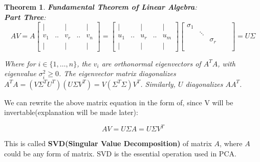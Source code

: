 \documentclass[a4paper]{book}
\newtheorem{theorem}{Theorem}[section]
\begin{document}
    \begin{theorem}
      \textbf{Fundamental Theorem of Linear Algebra}:\\
      \textbf{Part Three}:
      \begin{displaymath}
        AV = A
        \begin{bmatrix}
            |   &    &   |   &    &   |  \\
          v_{1} & .. & v_{r} & .. & v_{n}\\
            |   &    &   |   &    &   |
        \end{bmatrix}
        =
        \begin{bmatrix}
            |   &    &   |   &    &   |  \\
          u_{1} & .. & u_{r} & .. & u_{m}\\
            |   &    &   |   &    &   |  
        \end{bmatrix}
        \begin{bmatrix}
          \sigma_{1}  &         &       &    &      \\
                      & \ddots  &       &    &      \\
                      &         & \sigma_{r} &    & \\
                      &         &            &    & \\
        \end{bmatrix}
        = U\Sigma
      \end{displaymath}

      Where for $i \in \{1, \ldots , n\}$, the $v_i$ are orthonormal eigenvectors
      of $A^{T}A$, with eigenvalue $\sigma_{i}^{2} \geq 0$. The
      eigenvector matrix diagonalizes $A^{T}A =
      (V\Sigma^{T}U^{T})(U\Sigma V^{T}) = V(\Sigma^{T}\Sigma)V^{T}$.
      Similarly, $U$ diagonalizes $AA^{T}$.
    \end{theorem}

    We can rewrite the above matrix equation in the form of, since V
    will be invertable(explanation will be made later):

    \begin{equation}
      AV = U\Sigma
      A = U\Sigma V^{T}
      \label{eq:singular_value_decomposition}
    \end{equation}

    This is called \textbf{SVD(Singular Value Decomposition)} of matrix $A$,
    where $A$ could be any form of matrix. SVD is the essential operation
    used in PCA.
\end{document}
